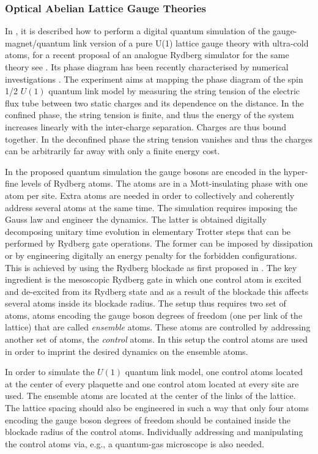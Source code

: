 \documentclass[epj,final]{svjour}
\begin{document}
\subsubsection{Optical Abelian Lattice Gauge Theories\cite{tagliacozzo2013optical}}

In \cite{tagliacozzo2013optical}, it is described how to perform a digital quantum simulation of the gauge-magnet/quantum link version of a pure U(1) lattice gauge theory with ultra-cold atoms, for a recent proposal of an analogue Rydberg simulator for the same theory see \cite{celi2019emerging}. Its phase diagram has been recently characterised by numerical investigations \cite{Banerjee2013QuantumLinkDeconfined}. The experiment aims at mapping the phase diagram of the spin 1/2 $U(1)$  quantum link model by measuring the string tension of the electric flux tube  between two static charges and its dependence on the distance. In the confined phase, the string tension is finite, and thus the energy of the system increases linearly with the inter-charge separation. Charges are thus bound together. In the deconfined phase the string tension vanishes and thus the charges can be arbitrarily far away with only a finite energy cost. 

In the proposed quantum simulation the gauge bosons are encoded in the hyper-fine levels of Rydberg atoms. The atoms are in a Mott-insulating phase with one atom per site. Extra atoms are needed in order to  collectively and coherently address several atoms at the same time. The simulation requires imposing the Gauss law and engineer the dynamics. The latter is obtained digitally decomposing unitary time evolution in elementary Trotter steps that can be performed by Rydberg gate operations. The former can be imposed by dissipation or by engineering digitally an energy penalty for the forbidden configurations. This is achieved by  using the Rydberg blockade  as first proposed in \cite{Mueller2009}. The key ingredient is the mesoscopic Rydberg gate in which one control atom is excited and de-excited from its Rydberg state and as a result of the blockade this affects several atoms inside its blockade radius.  The setup thus requires two set of atoms, atoms encoding the gauge boson degrees of freedom (one per link of the lattice) that are called \emph{ensemble} atoms. These atoms are controlled by addressing another set of atoms, the \emph{control} atoms. In this setup the control atoms are used in order to imprint the desired dynamics on the ensemble atoms.

In order to simulate the $U(1)$  quantum link model, one control atoms located at the center of  every plaquette and one control atom located at every site are used. The ensemble atoms are located at the center of the links of the lattice. The lattice spacing should also be engineered in such a way that only four atoms encoding the gauge boson degrees of freedom should be contained inside the blockade radius of the control atoms. Individually addressing and manipulating the control atoms via, e.g., a quantum-gas microscope is also needed. 
\end{document}
